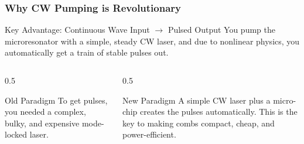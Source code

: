 \documentclass{beamer}
\begin{document}
\begin{frame}
    \frametitle{Why CW Pumping is Revolutionary}
    
    \begin{block}{Key Advantage: Continuous Wave Input $\rightarrow$ Pulsed Output}
        You pump the microresonator with a simple, steady CW laser, and due to nonlinear physics, you automatically get a train of stable pulses out.
    \end{block}
    
    \begin{columns}[T]
        \begin{column}{0.5\textwidth}
            \begin{alertblock}{Old Paradigm}
                To get pulses, you needed a complex, bulky, and expensive mode-locked laser.
            \end{alertblock}
        \end{column}
        \begin{column}{0.5\textwidth}
            \begin{block}{New Paradigm}
                A simple CW laser plus a micro-chip creates the pulses automatically. This is the key to making combs compact, cheap, and power-efficient.
            \end{block}
        \end{column}
    \end{columns}
\end{frame}
\end{document}
